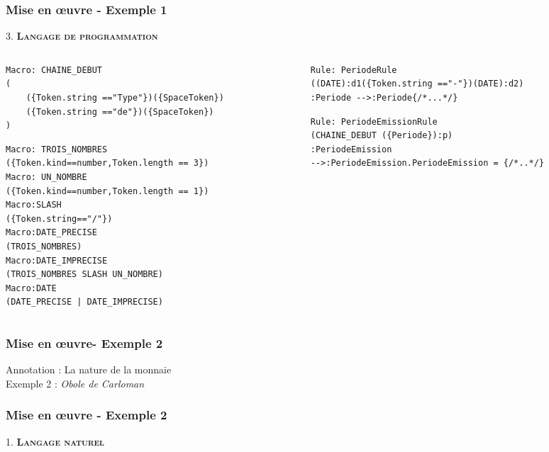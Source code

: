 \documentclass[10pt, compress]{beamer}
\begin{document}
\begin{frame}[fragile,t]
  \frametitle{Mise en œuvre - Exemple 1}
\begin{center}
 
\end{center}
3. \textbf{\textsc{\textbf{Langage de programmation}}}\\
\begin{columns}[t]
  \begin{column}{.5\linewidth}
 \begin{lstlisting}
Macro: CHAINE_DEBUT
(
    ({Token.string =="Type"})({SpaceToken})
    ({Token.string =="de"})({SpaceToken})
)
\end{lstlisting}
\begin{lstlisting}
Macro: TROIS_NOMBRES
({Token.kind==number,Token.length == 3})
Macro: UN_NOMBRE
({Token.kind==number,Token.length == 1})
Macro:SLASH
({Token.string=="/"})
Macro:DATE_PRECISE
(TROIS_NOMBRES)
Macro:DATE_IMPRECISE
(TROIS_NOMBRES SLASH UN_NOMBRE)
Macro:DATE
(DATE_PRECISE | DATE_IMPRECISE)
\end{lstlisting}
\end{column}


\begin{column}{.5\linewidth}
\begin{lstlisting}
Rule: PeriodeRule
((DATE):d1({Token.string =="-"})(DATE):d2)
:Periode -->:Periode{/*...*/}
\end{lstlisting}
\begin{lstlisting}
Rule: PeriodeEmissionRule
(CHAINE_DEBUT ({Periode}):p)
:PeriodeEmission
-->:PeriodeEmission.PeriodeEmission = {/*..*/}
\end{lstlisting}
\end{column}
\end{columns}
\end{frame}

\begin{frame}[fragile]
  \frametitle{Mise en œuvre- Exemple 2}
Annotation : La nature de la monnaie \\
Exemple 2 : \textit{Obole de Carloman}
\end{frame}

\begin{frame}[fragile,t]
  \frametitle{Mise en œuvre - Exemple 2}
\begin{center}
\end{center}
1. \textbf{\textsc{\textbf{Langage naturel}}}\\
\end{frame}
\end{document}
